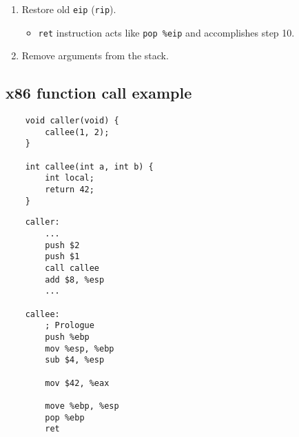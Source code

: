 \begin{enumerate}
    \item Restore old \texttt{eip} (\texttt{rip}).
    \begin{itemize}
        \item \texttt{ret} instruction acts like \texttt{pop \%eip} and accomplishes step 10.
    \end{itemize}
    
    \item Remove arguments from the stack.
\end{enumerate}

\subsection{x86 function call example}
\begin{multicols}{2}
	\begin{verbatim}
    void caller(void) {
        callee(1, 2);
    }
    
    int callee(int a, int b) {
        int local;
        return 42;
    }
	\end{verbatim}
	
	\columnbreak
	
	\begin{verbatim}
	caller:
    	...
    	push $2
    	push $1
    	call callee
    	add $8, %esp
    	...
	
	callee:
    	; Prologue
    	push %ebp
    	mov %esp, %ebp
    	sub $4, %esp
    	
    	mov $42, %eax
    	
    	move %ebp, %esp
    	pop %ebp
    	ret
	\end{verbatim}
\end{multicols}